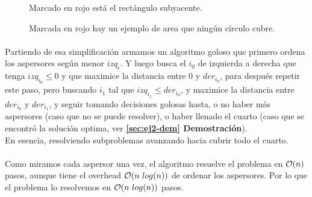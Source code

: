 \documentclass[./main.tex]{subfiles}
\begin{document}
\begin{figure}[H]
\centering


\caption{Marcado en rojo está el rectángulo subyacente.}
\label{fig:ej2-simple-sprinkle}
\end{figure}

\begin{figure}[H]
\centering


\caption{Marcada en rojo hay un ejemplo de area que ningún círculo cubre.}
\label{fig:ej2-two-sprinklers}
\end{figure}

\paragraph{} Partiendo de esa simplificación armamos un algoritmo goloso que primero ordena los aspersores según menor \(izq_i\). Y luego busca el \(i_0\) de izquierda a derecha que tenga \(izq_{i_0} \leq 0\) y que maximice la distancia entre 0 y \(der_{i_0}\), para después repetir este paso, pero buscando \(i_1\) tal que \(izq_{i_1} \leq der_{i_0}\), y maximice la distancia entre \(der_{i_0}\) y \(der_{i_1}\), y seguir tomando decisiones golosas hasta, o no haber más aspersores (caso que no se puede resolver), o haber llenado el cuarto (caso que se encontró la solución optima, ver \textbf{\ref{sec:ej2-dem} Demostración}). \\
En esencia, resolviendo subproblemas avanzando hacia cubrir todo el cuarto.

\paragraph{} Como miramos cada aspersor una vez, el algoritmo resuelve el problema en \(\mathcal{O}(n)\) pasos, aunque tiene el overhead \(\mathcal{O}(n\ log(n))\) de ordenar los aspersores. Por lo que el problema lo resolvemos en \(\mathcal{O}(n\ log(n))\) pasos. %
\end{document}
